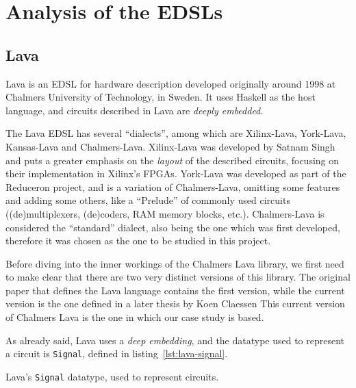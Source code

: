 \section{Analysis of the EDSLs}
\label{sec:edsls}

    \subsection{Lava}
    \label{subsec:lava}

        Lava\cite{lava1998} is an EDSL for hardware description developed originally around 1998 at
        Chalmers University of Technology, in Sweden. It uses Haskell as the host language, and
        circuits described in Lava are \emph{deeply embedded}.

        The Lava EDSL has several ``dialects'', among which are Xilinx-Lava, York-Lava, Kansas-Lava
        and Chalmers-Lava. Xilinx-Lava\cite{xilinx-lava} was developed by Satnam Singh and puts a
        greater emphasis on the \emph{layout} of the described circuits, focusing on their
        implementation in Xilinx's FPGAs. York-Lava was developed as part of the
        Reduceron\cite{reduceron} project, and is a variation of Chalmers-Lava, omitting some
        features and adding some others, like a ``Prelude'' of commonly used circuits
        ((de)multiplexers, (de)coders, RAM memory blocks, etc.). Chalmers-Lava is considered the
        ``standard'' dialect, also being the one which was first developed, therefore it was chosen
        as the one to be studied in this project.

        Before diving into the inner workings of the Chalmers Lava library, we first need to make
        clear that there are two very distinct versions of this library. The original paper that
        defines the Lava language\cite{lava1998} contains the first version, while the current
        version is the one defined in a later thesis\cite{claessen-thesis} by Koen Claessen
        This current version of Chalmers Lava is the one in which our case study is based.

        As already said, Lava uses a \emph{deep embedding}, and the datatype used to represent a
        circuit is \texttt{Signal}, defined in listing~\ref{lst:lava-signal}.

        \begin{listing}[h!]
            \caption{Lava's \texttt{Signal} datatype, used to represent circuits.
                \label{lst:lava-signal}}
        \end{listing}

